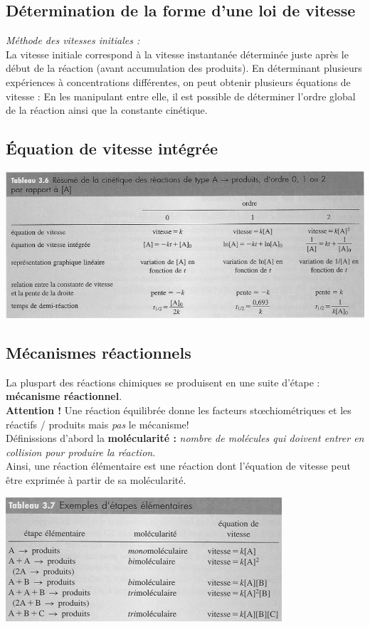 \documentclass[12pt, a4paper]{article}
\begin{document}
\subsection{Détermination de la forme d'une loi de vitesse}
\textit{Méthode des vitesses initiales :}\\
La vitesse initiale correspond à la vitesse instantanée déterminée juste après le début de la réaction (avant accumulation des produits). En déterminant plusieurs expériences à concentrations différentes, on peut obtenir plusieurs équations de vitesse :  En les manipulant entre elle, il est possible de déterminer l'ordre global de la réaction ainsi que la constante cinétique.
\subsection{Équation de vitesse intégrée}
\begin{center}
\includegraphics[scale=0.70]{image1.png}\\
\end{center}
\subsection{Mécanismes réactionnels}
La pluspart des réactions chimiques se produisent en une suite d'étape : \textbf{mécanisme réactionnel}.\\

\textbf{Attention !} Une réaction équilibrée donne les facteurs stœchiométriques et les réactifs / produits mais \textit{pas} le mécanisme!
\\
Définissions d'abord la \textbf{molécularité :} \textit{nombre de molécules qui doivent entrer en collision pour produire la réaction}.\\
Ainsi, une réaction élémentaire est une réaction dont l'équation de vitesse peut être exprimée à partir de sa molécularité.
\begin{center}
\includegraphics[scale=0.70]{image2.png}\\
\end{center}
\end{document}

